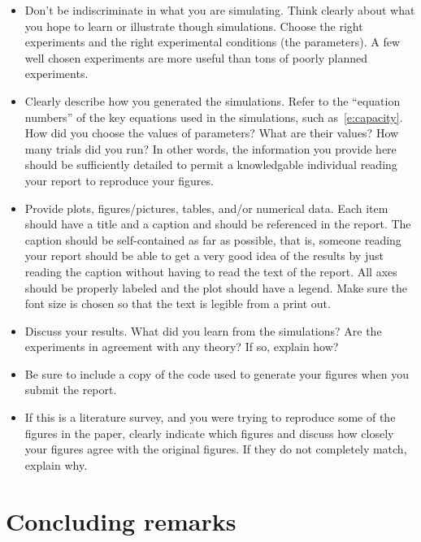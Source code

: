 \documentclass[article,11pt,onecolumn,final]{IEEEtran}
\begin{document}
\begin{itemize}
\item Don't be indiscriminate in what
you are simulating. Think clearly about what you hope to learn or
illustrate though simulations. Choose the right experiments and the
right experimental conditions (the parameters). A few well chosen experiments
are more useful than tons of poorly planned experiments.

\item Clearly describe how you generated the simulations. Refer to the ``equation numbers'' of the key equations used in the simulations, such as~\eqref{e:capacity}.
 How did you choose
the values of parameters? What are their values? How many
trials did you run? In other words, the information you
provide here should be sufficiently detailed to permit a knowledgable
individual reading your report to reproduce your figures.

\item Provide plots, figures/pictures,
tables, and/or numerical data. Each item should have a title and a
caption and should be referenced in the report. The caption should be
self-contained as far as possible, that is, someone reading your
report should be able to get a very good idea of the results by just
reading the caption without having to read the text of the
report. All axes should be properly
labeled and the plot should have a legend. Make sure the font size is chosen so that the 
text is legible from a print out.

\item Discuss your results. What did you learn from the
simulations? Are the experiments in agreement with any theory? If so,
explain how? 

\item Be sure to include a copy of the code used to generate your figures when you submit the report.

\item If this is a literature survey, and you were trying to reproduce some of the figures in the paper, clearly indicate which figures and discuss how closely your figures agree with the original figures. If they do not completely match, explain why.

\end{itemize}

\section{Concluding remarks}
\end{document}
